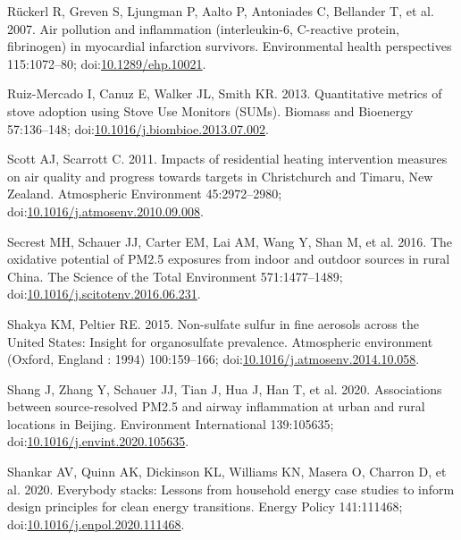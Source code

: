 \documentclass[
  letterpaper,
  DIV=11,
  numbers=noendperiod]{scrartcl}
\newlength{\cslhangindent}
\newenvironment{CSLReferences}[2] %
 {\begin{list}{}{%
  \setlength{\itemindent}{0pt}
  \setlength{\leftmargin}{0pt}
  \setlength{\parsep}{0pt}
  \ifodd #1
   \setlength{\leftmargin}{\cslhangindent}
   \setlength{\itemindent}{-1\cslhangindent}
  \fi
  \setlength{\itemsep}{#2\baselineskip}}}
 {\end{list}}
\begin{document}
\begin{CSLReferences}{1}{1}
Rückerl R, Greven S, Ljungman P, Aalto P, Antoniades C, Bellander T, et
al. 2007. Air pollution and inflammation (interleukin-6, {C-reactive}
protein, fibrinogen) in myocardial infarction survivors. Environmental
health perspectives 115:1072--80;
doi:\href{https://doi.org/10.1289/ehp.10021}{10.1289/ehp.10021}.

Ruiz-Mercado I, Canuz E, Walker JL, Smith KR. 2013. Quantitative metrics
of stove adoption using {Stove Use Monitors} ({SUMs}). Biomass and
Bioenergy 57:136--148;
doi:\href{https://doi.org/10.1016/j.biombioe.2013.07.002}{10.1016/j.biombioe.2013.07.002}.

Scott AJ, Scarrott C. 2011. Impacts of residential heating intervention
measures on air quality and progress towards targets in {Christchurch}
and {Timaru}, {New Zealand}. Atmospheric Environment 45:2972--2980;
doi:\href{https://doi.org/10.1016/j.atmosenv.2010.09.008}{10.1016/j.atmosenv.2010.09.008}.

Secrest MH, Schauer JJ, Carter EM, Lai AM, Wang Y, Shan M, et al. 2016.
The oxidative potential of {PM2}.5 exposures from indoor and outdoor
sources in rural {China}. The Science of the Total Environment
571:1477--1489;
doi:\href{https://doi.org/10.1016/j.scitotenv.2016.06.231}{10.1016/j.scitotenv.2016.06.231}.

Shakya KM, Peltier RE. 2015. Non-sulfate sulfur in fine aerosols across
the {United States}: {Insight} for organosulfate prevalence. Atmospheric
environment (Oxford, England : 1994) 100:159--166;
doi:\href{https://doi.org/10.1016/j.atmosenv.2014.10.058}{10.1016/j.atmosenv.2014.10.058}.

Shang J, Zhang Y, Schauer JJ, Tian J, Hua J, Han T, et al. 2020.
Associations between source-resolved {PM2}.5 and airway inflammation at
urban and rural locations in {Beijing}. Environment International
139:105635;
doi:\href{https://doi.org/10.1016/j.envint.2020.105635}{10.1016/j.envint.2020.105635}.

Shankar AV, Quinn AK, Dickinson KL, Williams KN, Masera O, Charron D, et
al. 2020. Everybody stacks: {Lessons} from household energy case studies
to inform design principles for clean energy transitions. Energy Policy
141:111468;
doi:\href{https://doi.org/10.1016/j.enpol.2020.111468}{10.1016/j.enpol.2020.111468}.


\end{CSLReferences}
\end{document}
